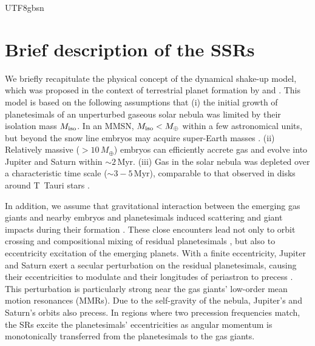\documentclass[tighten]{aastex6}
\begin{document}
\begin{CJK*}{UTF8}{gbsn}

\section{Brief description of the SSRs}
\label{sec:quantitive}

We briefly recapitulate the physical concept of the dynamical 
shake-up model, which was proposed in the context of terrestrial 
planet formation by \cite{nagasawa2005} and \cite{thommes2008}. This model is based on the following assumptions that (i) the initial growth 
of planetesimals of an unperturbed gaseous solar nebula was 
limited by their isolation mass $M_{\rm iso}$.  In an MMSN, $M_{\rm iso} < M_\oplus$ within a few astronomical units, but beyond the snow line embryos may acquire super-Earth masses
\citep{idalin2004}.  (ii) Relatively massive ($> 10\,M_\oplus$) 
embryos can efficiently accrete gas \citep{pollack1996} and evolve 
into Jupiter and Saturn within $\sim 2$\,Myr. (iii) Gas in the solar 
nebula was depleted over a characteristic time scale ($\sim 3-5$\,Myr), comparable to that observed in disks around T~Tauri stars
\citep{hartmann1998}.

In addition, we assume that gravitational interaction between the 
emerging gas giants and nearby embryos and planetesimals induced 
scattering and giant impacts during their formation \citep{
liagnorlin2010, idalin2013}. These close encounters lead not only 
to orbit crossing \citep{zhou2007} and compositional 
mixing of residual planetesimals \citep{demeo2014}, but 
also to eccentricity excitation of the emerging planets. 
With a finite eccentricity, Jupiter and Saturn exert a secular 
perturbation on the residual planetesimals, causing their eccentricities 
to modulate and their longitudes of periastron to precess \citep{murray1999}. 
This perturbation is particularly strong near the gas giants'
low-order mean motion resonances (MMRs).  Due to the self-gravity 
of the nebula, Jupiter's and Saturn's orbits also precess. In regions 
where two precession frequencies match, the SRs 
excite the planetesimals' eccentricities as angular 
momentum is monotonically transferred from the planetesimals to 
the gas giants.


\end{CJK*}
\end{document}
